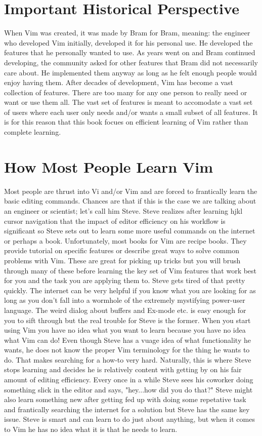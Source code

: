 \documentclass[12pt]{book}
\begin{document}
\section{Important Historical Perspective}
When Vim was created, it was made by Bram for Bram, meaning: the engineer who developed Vim initially, developed it for his personal use.
He developed the features that he personally wanted to use.
As years went on and Bram continued developing, the community asked for other features that Bram did not necessarily care about.
He implemented them anyway as long as he felt enough people would enjoy having them.
After decades of development, Vim has become a vast collection of features.
There are too many for any one person to really need or want or use them all.
The vast set of features is meant to accomodate a vast set of users where each user only needs and/or wants a small subset of all features.
It is for this reason that this book focues on efficient learning of Vim rather than complete learning.

\section{How Most People Learn Vim}
Most people are thrust into Vi and/or Vim and are forced to frantically learn the basic editing commands.
Chances are that if this is the case we are talking about an engineer or scientist; let's call him Steve.
Steve realizes after learning hjkl cursor navigation that the impact of editor efficiency on his workflow is significant so Steve sets out to learn some more useful commands on the internet
or perhaps a book.
Unfortunately, most books for Vim are recipe books.
They provide tutorial on specific features or describe great ways to solve common problems with Vim.
These are great for picking up tricks but you will brush through many of these before learning the key set of Vim features that work best for you and the task you are applying them to.
Steve gets tired of that pretty quickly.
The internet can be very helpful if you know what you are looking for as long as you don't fall into a wormhole of the extremely mystifying power-user language.
The weird dialog about buffers and Ex-mode etc. is easy enough for you to sift through but the real trouble for Steve is the former.
When you start using Vim you have no idea what you want to learn because you have no idea what Vim can do!
Even though Steve has a vuage idea of what functionality he wants, he does not know the proper Vim terminology for the thing he wants to do.
That makes searching for a how-to very hard.
Naturally, this is where Steve stops learning and decides he is relatively content with getting by on his fair amount of editing efficiency.
Every once in a while Steve sees his coworker doing something slick in the editor and says, "hey...how did you do that?"
Steve might also learn something new after getting fed up with doing some repetative task and frantically searching the internet for a solution but Steve has the same key issue.
Steve is smart and can learn to do just about anything, but when it comes to Vim he has no idea what it is that he needs to learn.
\end{document}
